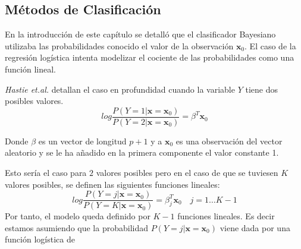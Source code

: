 \subsection{Métodos de Clasificación}

\noindent En la introducción de este capítulo se detalló que el clasificador Bayesiano utilizaba las probabilidades conocido el valor de la observación $\textbf{x}_0$. El caso de la regresión logística intenta modelizar el cociente de las probabilidades como una función lineal. 

\noindent \textit{Hastie et.al.}\cite{Hastie 2001} detallan el caso en profundidad cuando la variable $Y$ tiene dos posibles valores.
\begin{equation}
log \dfrac{P(Y=1|\textbf{x}=\textbf{x}_0)}{P(Y=2|\textbf{x}=\textbf{x}_0)}=\beta^T \textbf{x}_0
\end{equation}

\noindent Donde $\beta$ es un vector de longitud $p+1$ y a $\textbf{x}_0$ es una observación del vector aleatorio y se le ha añadido en la primera componente el valor constante 1.

\noindent Esto sería el caso para $2$ valores posibles pero en el caso de que se tuviesen $K$ valores posibles, se definen las siguientes funciones lineales:
\begin{equation}
log \dfrac{P(Y=j|\textbf{x}=\textbf{x}_0)}{P(Y=K|\textbf{x}=\textbf{x}_0)}=\beta_j^T \textbf{x}_0 \quad j=1\ldots K-1
\end{equation}
Por tanto, el modelo queda definido por $K-1$ funciones lineales. Es decir estamos asumiendo que la probabilidad $P(Y=j|\textbf{x}=\textbf{x}_0)$ viene dada por una función logística de 
